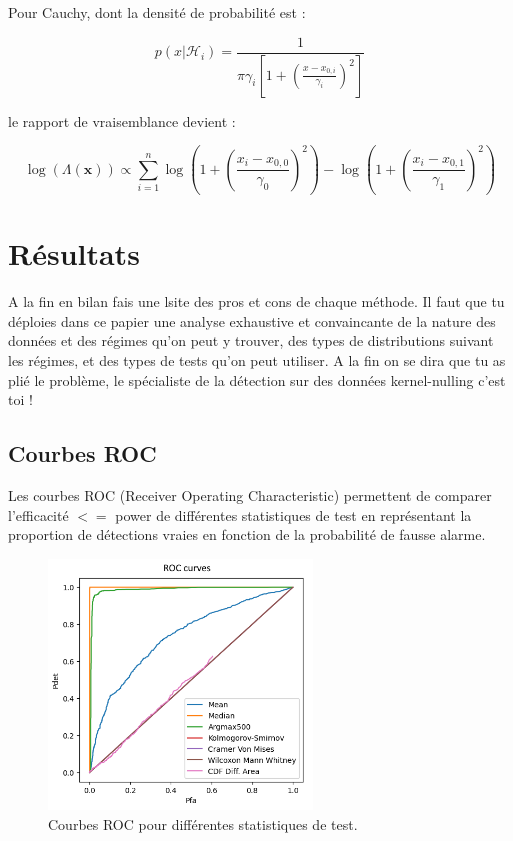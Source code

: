 \documentclass{article}
\newcommand{\dm}[1]{{\color{mulberry} #1}}
\begin{document}
Pour Cauchy, dont la densité de probabilité est :

\begin{equation}
    p(x|\mathcal{H}_i) = \frac{1}{\pi \gamma_i \left[1 + \left(\frac{x - x_{0,i}}{\gamma_i}\right)^2\right]}
\end{equation}

le rapport de vraisemblance devient :

\begin{equation}
    \log(\Lambda(\mathbf{x})) \propto \sum_{i=1}^{n} \log\left(1 + \left(\frac{x_i - x_{0,0}}{\gamma_0}\right)^2\right) - \log\left(1 + \left(\frac{x_i - x_{0,1}}{\gamma_1}\right)^2\right)
\end{equation}

\section{Résultats}

\dm{A la fin en bilan fais une lsite des pros et cons de chaque méthode. Il faut que tu déploies dans ce papier une analyse exhaustive et convaincante de la nature des données et des régimes qu'on peut y trouver, des types de distributions suivant les régimes, et des types de tests qu'on peut utiliser. A la fin on se dira que tu as plié le problème, le spécialiste de la détection sur des données kernel-nulling c'est toi !  }
\subsection{Courbes ROC}

Les courbes ROC (Receiver Operating Characteristic) permettent de comparer l'efficacité \dm{$<=$ power } de différentes statistiques de test en représentant la proportion de détections vraies en fonction de la probabilité de fausse alarme.

\begin{figure}[H]
\centering
\includegraphics[width=7cm]{img/roc_curves.png}
\caption{Courbes ROC pour différentes statistiques de test.}
\label{fig:roc}
\end{figure}
\end{document}
